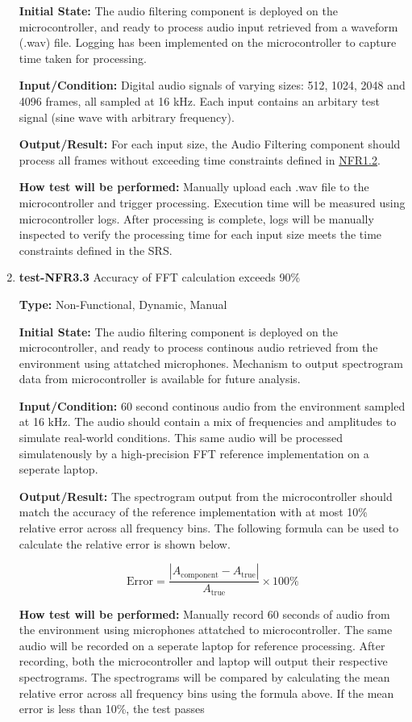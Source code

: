 \documentclass[12pt, titlepage]{article}
\begin{document}
\begin{enumerate}
\textbf{Initial State:} 
The audio filtering component is deployed on the microcontroller, and ready to 
process audio input retrieved from a waveform (.wav) file. Logging has been 
implemented on the microcontroller to capture time taken for processing.
					
\textbf{Input/Condition:} 
Digital audio signals of varying sizes: 512, 1024, 2048 and 4096 frames, all 
sampled at 16 kHz. Each input contains an arbitary test signal (sine wave with 
arbitrary frequency). 
					
\textbf{Output/Result:} 
For each input size, the Audio Filtering component should process all frames 
without exceeding time constraints defined in \hyperref[SRS-NFR1_2]{NFR1.2}. 
					
\textbf{How test will be performed:} 
Manually upload each .wav file to the microcontroller and trigger processing. 
Execution time will be measured using microcontroller logs. After processing
 is complete, logs will be manually inspected to verify the processing time
 for each input size meets the time constraints defined in the SRS.

\item{\textbf{test-NFR3.3} Accuracy of FFT calculation exceeds 90\%\\}

\textbf{Type:} Non-Functional, Dynamic, Manual
					
\textbf{Initial State:} 
The audio filtering component is deployed on the microcontroller, and ready to 
process continous audio retrieved from the environment using attatched 
microphones. Mechanism to output spectrogram data from microcontroller is 
available for future analysis.
					
\textbf{Input/Condition:} 
60 second continous audio from the environment sampled at 16 kHz. The audio 
should contain a mix of frequencies and amplitudes to simulate real-world 
conditions. This same audio will be processed simulatenously by a high-precision 
FFT reference implementation on a seperate laptop.
					
\textbf{Output/Result:} 
The spectrogram output from the microcontroller should match the accuracy of 
the reference implementation with at most 10\% relative error across all 
frequency bins. The following formula can be used to calculate the relative 
error is shown below. 

\[
\text{Error} = \frac{\left|A_{\text{component}} - A_{\text{true}}\right|}{A_{\text{true}}} \times 100\%
\]

\textbf{How test will be performed:} 
Manually record 60 seconds of audio from the environment using microphones 
attatched to microcontroller. The same audio will be recorded on a seperate 
laptop for reference processing. After recording, both the microcontroller and 
laptop will output their respective spectrograms. The spectrograms will be
compared by calculating the mean relative error across all frequency bins
using the formula above. If the mean error is less than 10\%, the test passes

\end{enumerate}
\end{document}
